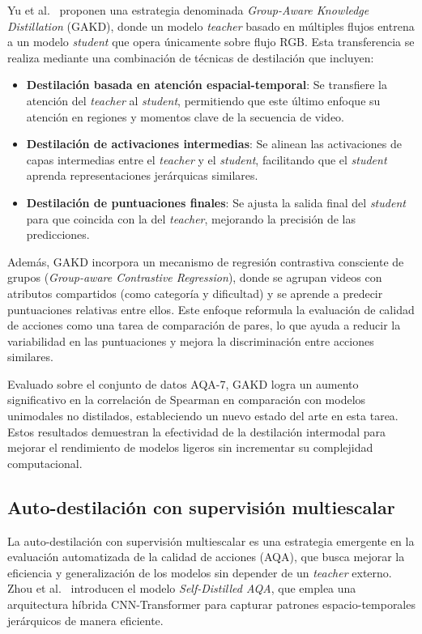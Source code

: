Yu et al.~\cite{Yu2021GroupAware} proponen una estrategia denominada \textit{Group-Aware Knowledge Distillation} (GAKD), donde un modelo \textit{teacher} basado en múltiples flujos entrena a un modelo \textit{student} que opera únicamente sobre flujo RGB. Esta transferencia se realiza mediante una combinación de técnicas de destilación que incluyen:

\begin{itemize}
    \item \textbf{Destilación basada en atención espacial-temporal}: Se transfiere la atención del \textit{teacher} al \textit{student}, permitiendo que este último enfoque su atención en regiones y momentos clave de la secuencia de video.
    \item \textbf{Destilación de activaciones intermedias}: Se alinean las activaciones de capas intermedias entre el \textit{teacher} y el \textit{student}, facilitando que el \textit{student} aprenda representaciones jerárquicas similares.
    \item \textbf{Destilación de puntuaciones finales}: Se ajusta la salida final del \textit{student} para que coincida con la del \textit{teacher}, mejorando la precisión de las predicciones.
\end{itemize}

Además, GAKD incorpora un mecanismo de regresión contrastiva consciente de grupos (\textit{Group-aware Contrastive Regression}), donde se agrupan videos con atributos compartidos (como categoría y dificultad) y se aprende a predecir puntuaciones relativas entre ellos. Este enfoque reformula la evaluación de calidad de acciones como una tarea de comparación de pares, lo que ayuda a reducir la variabilidad en las puntuaciones y mejora la discriminación entre acciones similares.

Evaluado sobre el conjunto de datos AQA-7, GAKD logra un aumento significativo en la correlación de Spearman en comparación con modelos unimodales no distilados, estableciendo un nuevo estado del arte en esta tarea. Estos resultados demuestran la efectividad de la destilación intermodal para mejorar el rendimiento de modelos ligeros sin incrementar su complejidad computacional.



\subsection{Auto-destilación con supervisión multiescalar}

La auto-destilación con supervisión multiescalar es una estrategia emergente en la evaluación automatizada de la calidad de acciones (AQA), que busca mejorar la eficiencia y generalización de los modelos sin depender de un \textit{teacher} externo. Zhou et al.~\cite{Zhou2023AQA_SD} introducen el modelo \textit{Self-Distilled AQA}, que emplea una arquitectura híbrida CNN-Transformer para capturar patrones espacio-temporales jerárquicos de manera eficiente.

